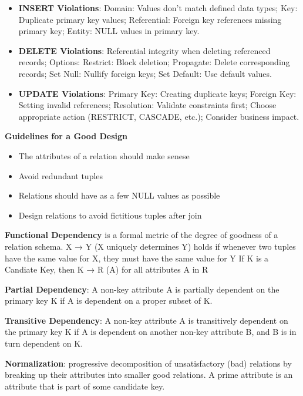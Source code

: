 \documentclass{article}
\begin{document}
\begin{itemize}
    \item \textbf{INSERT Violations}: Domain: Values don't match defined data types; Key: Duplicate primary key values; Referential: Foreign key references missing primary key; Entity: NULL values in primary key.
    \item \textbf{DELETE Violations}: Referential integrity when deleting referenced records; Options: Restrict: Block deletion; Propagate: Delete corresponding records; Set Null: Nullify foreign keys; Set Default: Use default values.
    \item \textbf{UPDATE Violations}: Primary Key: Creating duplicate keys; Foreign Key: Setting invalid references; Resolution: Validate constraints first; Choose appropriate action (RESTRICT, CASCADE, etc.); Consider business impact.
\end{itemize}

\noindent \textbf{Guidelines for a Good Design}

\begin{itemize}
    \item The attributes of a relation should make senese
    \item Avoid redundant tuples
    \item Relations should have as a few NULL values as possible
    \item Design relations to avoid fictitious tuples after join
\end{itemize}

\noindent \textbf{Functional Dependency} is a formal metric of the degree of goodness of a relation schema.
X → Y (X uniquely determines Y) holds if whenever two tuples have the same value for X, they must have the same value for Y
If K is a Candiate Key, then K → R (A) for all attributes A in R

\noindent \textbf{Partial Dependency}: A non-key attribute A is partially dependent on the primary key K if A 
is dependent on a proper subset of K.

\noindent \textbf{Transitive Dependency}: A non-key attribute A is transitively dependent on the primary key K 
if A is dependent on another non-key attribute B, and B is in turn dependent on K.

\noindent \textbf{Normalization}: progressive decomposition of unsatisfactory (bad) relations by breaking
up their attributes into smaller good relations. A prime attribute is an attribute that is part of some candidate key.
\end{document}
